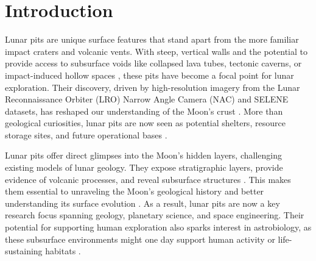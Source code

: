 \graphicspath{{img/ch1}}

\section{Introduction}
Lunar pits are unique surface features that stand apart from the more familiar impact craters and volcanic vents. With steep, vertical walls and the potential to provide access to subsurface voids like collapsed lava tubes, tectonic caverns, or impact-induced hollow spaces \cite{lunar-pit-distribution, lunar-pits-entrances-to-caves, new-wagner}, these pits have become a focal point for lunar exploration. Their discovery, driven by high-resolution imagery from the Lunar Reconnaissance Orbiter (LRO) Narrow Angle Camera (NAC) and SELENE datasets, has reshaped our understanding of the Moon's crust \cite{lunar-pit-distribution, new-wagner, Carrer2024}. More than geological curiosities, lunar pits are now seen as potential shelters, resource storage sites, and future operational bases \cite{bases-feng, newer-thermal, sublunear-lava}.

Lunar pits offer direct glimpses into the Moon’s hidden layers, challenging existing models of lunar geology. They expose stratigraphic layers, provide evidence of volcanic processes, and reveal subsurface structures \cite{sublunear-lava, lunar-pit-distribution}. This makes them essential to unraveling the Moon’s geological history and better understanding its surface evolution \cite{new-wagner, thermal-lunar-pits, lunar-pits-entrances-to-caves}. As a result, lunar pits are now a key research focus spanning geology, planetary science, and space engineering. Their potential for supporting human exploration also sparks interest in astrobiology, as these subsurface environments might one day support human activity or life-sustaining habitats \cite{bases-feng, newer-thermal, thermal-lunar-pits}.


